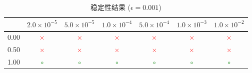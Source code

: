 \documentclass[12pt,a4paper]{article}
\begin{document}
\begin{table}[htbp]
	\centering
	\caption{稳定性结果 ($\epsilon = 0.001$)}
	\begin{tabular}{c|cccccc}
		\toprule
		\diagbox{K}{$\Delta t$} & $2.0 \times 10^{-5}$ & $5.0 \times 10^{-5}$ & $1.0 \times 10^{-4}$ & $5.0 \times 10^{-4}$ & $1.0 \times 10^{-3}$ & $1.0 \times 10^{-2}$ \\
		\midrule
		0.00 & \textcolor{red}{$\times$} & \textcolor{red}{$\times$} & \textcolor{red}{$\times$} & \textcolor{red}{$\times$} & \textcolor{red}{$\times$} & \textcolor{red}{$\times$} \\
		0.50 & \textcolor{red}{$\times$} & \textcolor{red}{$\times$} & \textcolor{red}{$\times$} & \textcolor{red}{$\times$} & \textcolor{red}{$\times$} & \textcolor{red}{$\times$} \\
		1.00 & \textcolor{green}{$\circ$} & \textcolor{green}{$\circ$} & \textcolor{green}{$\circ$} & \textcolor{green}{$\circ$} & \textcolor{green}{$\circ$} & \textcolor{green}{$\circ$} \\
		\bottomrule
	\end{tabular}
\end{table}
\end{document}
